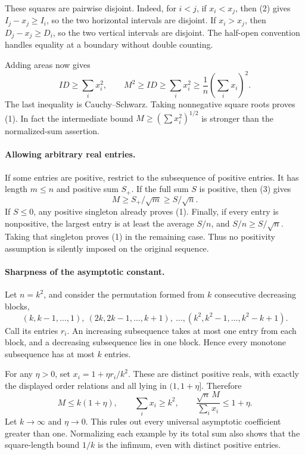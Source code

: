 These squares are pairwise disjoint. Indeed, for \(i<j\), if \(x_i<x_j\), then (2) gives \(I_j-x_j\geq I_i\), so the two horizontal intervals are disjoint. If \(x_i>x_j\), then \(D_j-x_j\geq D_i\), so the two vertical intervals are disjoint. The half-open convention handles equality at a boundary without double counting.

Adding areas now gives
\[
 ID\geq\sum_i x_i^2,
 \qquad M^2\geq ID\geq\sum_i x_i^2
 \geq\frac1n\left(\sum_i x_i\right)^2. \tag{3}
\]
The last inequality is Cauchy--Schwarz. Taking nonnegative square roots proves (1). In fact the intermediate bound \(M\geq(\sum x_i^2)^{1/2}\) is stronger than the normalized-sum assertion.

\paragraph{Allowing arbitrary real entries.}
If some entries are positive, restrict to the subsequence of positive entries. It has length \(m\leq n\) and positive sum \(S_+\). If the full sum \(S\) is positive, then (3) gives
\[
 M\geq S_+/\sqrt m\geq S/\sqrt n.
\]
If \(S\leq0\), any positive singleton already proves (1). Finally, if every entry is nonpositive, the largest entry is at least the average \(S/n\), and
\(S/n\geq S/\sqrt n\). Taking that singleton proves (1) in the remaining case. Thus no positivity assumption is silently imposed on the original sequence.

\paragraph{Sharpness of the asymptotic constant.}
Let \(n=k^2\), and consider the permutation formed from \(k\) consecutive decreasing blocks,
\[
 (k,k-1,\ldots,1),\ (2k,2k-1,\ldots,k+1),\ \ldots,
 (k^2,k^2-1,\ldots,k^2-k+1).
\]
Call its entries \(r_i\). An increasing subsequence takes at most one entry from each block, and a decreasing subsequence lies in one block. Hence every monotone subsequence has at most \(k\) entries.

For any \(\eta>0\), set \(x_i=1+\eta r_i/k^2\). These are distinct positive reals, with exactly the displayed order relations and all lying in \((1,1+\eta]\). Therefore
\[
 M\leq k(1+\eta),\qquad \sum_i x_i\geq k^2,
 \qquad \frac{\sqrt n\,M}{\sum_i x_i}\leq1+\eta.
\]
Let \(k\to\infty\) and \(\eta\to0\). This rules out every universal asymptotic coefficient greater than one. Normalizing each example by its total sum also shows that the square-length bound \(1/k\) is the infimum, even with distinct positive entries.

